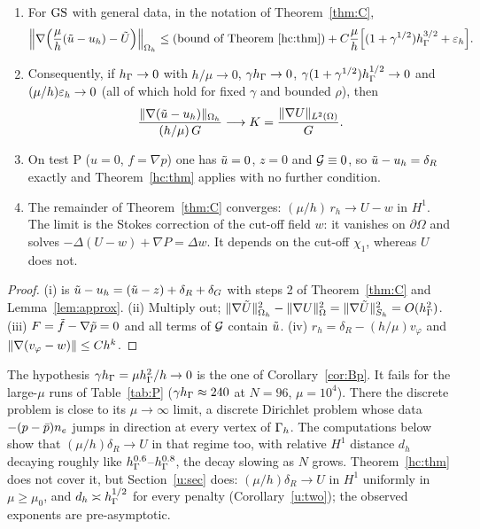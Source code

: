 \begin{corollary}\label{hc:cor}
\begin{enumerate}[label=(\roman*)]
\item For $\mathrm{GS}$ with general data, in the notation of Theorem~\ref{thm:C},
\[
\Bigl\|\nabla\Bigl(\frac\mu h(\tilde u-u_h)-\tilde U\Bigr)\Bigr\|_{\Omega_h}\le\text{(bound of Theorem~\ref{hc:thm})}
+C\frac\mu h\Bigl[(1+\gamma^{1/2})h_\Gamma^{3/2}+\varepsilon_h\Bigr].
\]
\item Consequently, if $h_\Gamma\to0$ with $h/\mu\to0$, $\gamma h_\Gamma\to0$, $\gamma(1+\gamma^{1/2})h_\Gamma^{1/2}\to0$ and
$(\mu/h)\varepsilon_h\to0$ (all of which hold for fixed $\gamma$ and bounded $\rho$), then
\[
\frac{\lVert \nabla(\tilde u-u_h)\rVert_{\Omega_h}}{(h/\mu)\,G}\longrightarrow K=\frac{\lVert \nabla U\rVert_{L^2(\Omega)}}{G}.
\]
\item On test P ($u=0$, $f=\nabla p$) one has $\tilde u=0$, $z=0$ and $\mathcal G\equiv0$, so $\tilde u-u_h=\delta_R$ exactly and
Theorem~\ref{hc:thm} applies with no further condition.
\item The remainder of Theorem~\ref{thm:C} converges: $(\mu/h)\,r_h\to U-w$ in $H^1$. The limit is the Stokes correction
of the cut-off field $w$: it vanishes on $\partial\Omega$ and solves $-\Delta(U-w)+\nabla P=\Delta w$. It depends on the
cut-off $\chi_1$, whereas $U$ does not.
\end{enumerate}
\end{corollary}

\begin{proof}
(i) is $\tilde u-u_h=(\tilde u-z)+\delta_R+\delta_G$ with steps 2 of Theorem~\ref{thm:C} and Lemma~\ref{lem:approx}. (ii) Multiply out;
$\lVert \nabla\tilde U\rVert^2_{\Omega_h}-\lVert \nabla U\rVert^2_{\Omega}=\lVert \nabla\tilde U\rVert^2_{S_h}=O(h_\Gamma^2)$. (iii) $F=\tilde f-\nabla\tilde p=0$ and all terms of
$\mathcal G$ contain $\tilde u$. (iv) $r_h=\delta_R-(h/\mu)v_\varphi$ and $\lVert \nabla(v_\varphi-w)\rVert\le Ch^k$.
\end{proof}

\begin{remark}\label{hc:regime}
The hypothesis $\gamma h_\Gamma=\mu h_\Gamma^2/h\to0$ is the one of Corollary~\ref{cor:Bp}. It fails for the large-$\mu$ runs of
Table~\ref{tab:P} ($\gamma h_\Gamma\approx240$ at $N=96$, $\mu=10^4$). There the discrete problem is close to its $\mu\to\infty$ limit,
a discrete Dirichlet problem whose data $-(p-\bar p)n_e$ jumps in direction at every vertex of $\Gamma_h$. The computations below
show that $(\mu/h)\delta_R\to U$ in that regime too, with relative $H^1$ distance $d_h$ decaying roughly like $h_\Gamma^{0.6}$--$h_\Gamma^{0.8}$, the decay slowing as $N$ grows.
Theorem~\ref{hc:thm} does not cover it, but Section~\ref{u:sec} does: $(\mu/h)\delta_R\to U$ in $H^1$ uniformly in $\mu\ge\mu_0$, and $d_h\asymp h_\Gamma^{1/2}$ for every penalty (Corollary~\ref{u:two}); the observed exponents are pre-asymptotic.
\end{remark}

